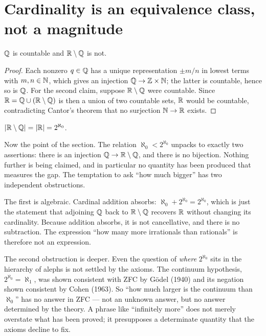 \documentclass{essay}
\newcommand{\Irr}{\R \setminus \Q}
\begin{document}
\section{Cardinality is an equivalence class, not a magnitude}
\label{sec:card}

\begin{theorem}
$\mathbb{Q}$ is countable and $\Irr$ is not.
\end{theorem}

\begin{proof}
Each nonzero $q \in \mathbb{Q}$ has a unique representation $\pm m/n$ in lowest
terms with $m, n \in \mathbb{N}$, which gives an injection $\mathbb{Q} \to \mathbb{Z} \times
\mathbb{N}$; the latter is countable, hence so is $\mathbb{Q}$. For the second claim,
suppose $\Irr$ were countable. Since $\R = \Q \cup (\Irr)$ is then a
union of two countable sets, $\mathbb{R}$ would be countable, contradicting
Cantor's theorem that no surjection $\mathbb{N} \to \mathbb{R}$ exists.
\end{proof}

\begin{corollary}
$|\Irr| = |\R| = 2^{\aleph_0}$.
\end{corollary}

Now the point of the section. The relation $\aleph_0 < 2^{\aleph_0}$
unpacks to exactly two assertions: there is an injection $\Q \to \Irr$,
and there is no bijection. Nothing further is being claimed, and in
particular no quantity has been produced that measures the gap. The
temptation to ask ``how much bigger'' has two independent obstructions.

The first is algebraic. Cardinal addition absorbs: $\aleph_0 +
2^{\aleph_0} = 2^{\aleph_0}$, which is just the statement that
adjoining $\mathbb{Q}$ back to $\Irr$ recovers $\mathbb{R}$ without changing its
cardinality. Because addition absorbs, it is not cancellative, and
there is no subtraction. The expression ``how many more irrationals
than rationals'' is therefore not an expression.

The second obstruction is deeper. Even the question of \emph{where}
$2^{\aleph_0}$ sits in the hierarchy of alephs is not settled by the
axioms. The continuum hypothesis, $2^{\aleph_0} = \aleph_1$, was shown
consistent with ZFC by G\"odel (1940) and its negation shown consistent
by Cohen (1963). So ``how much larger is the continuum than
$\aleph_0$'' has no answer in ZFC --- not an unknown answer, but no
answer determined by the theory. A phrase like ``infinitely more'' does
not merely overstate what has been proved; it presupposes a
determinate quantity that the axioms decline to fix.
\end{document}

